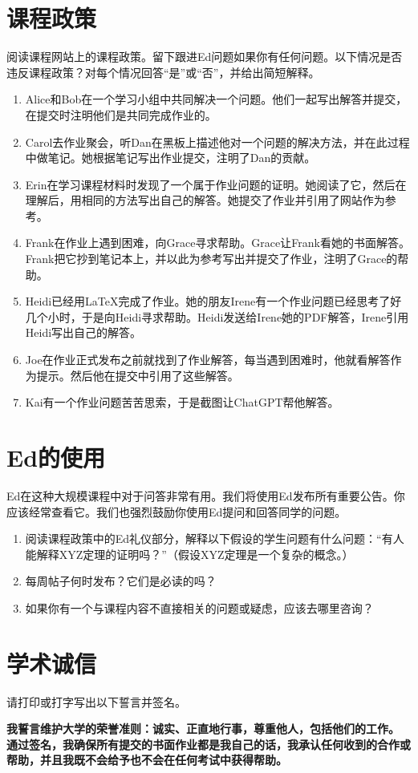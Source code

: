 \documentclass[11pt]{article}
\begin{document}
\section*{课程政策}
阅读课程网站上的课程政策。留下跟进Ed问题如果你有任何问题。以下情况是否违反课程政策？对每个情况回答“是”或“否”，并给出简短解释。
\begin{enumerate}
  \item Alice和Bob在一个学习小组中共同解决一个问题。他们一起写出解答并提交，在提交时注明他们是共同完成作业的。
  \item Carol去作业聚会，听Dan在黑板上描述他对一个问题的解决方法，并在此过程中做笔记。她根据笔记写出作业提交，注明了Dan的贡献。
  \item Erin在学习课程材料时发现了一个属于作业问题的证明。她阅读了它，然后在理解后，用相同的方法写出自己的解答。她提交了作业并引用了网站作为参考。
  \item Frank在作业上遇到困难，向Grace寻求帮助。Grace让Frank看她的书面解答。Frank把它抄到笔记本上，并以此为参考写出并提交了作业，注明了Grace的帮助。
  \item Heidi已经用LaTeX完成了作业。她的朋友Irene有一个作业问题已经思考了好几个小时，于是向Heidi寻求帮助。Heidi发送给Irene她的PDF解答，Irene引用Heidi写出自己的解答。
  \item Joe在作业正式发布之前就找到了作业解答，每当遇到困难时，他就看解答作为提示。然后他在提交中引用了这些解答。
  \item Kai有一个作业问题苦苦思索，于是截图让ChatGPT帮他解答。
\end{enumerate}

\section*{Ed的使用}
Ed在这种大规模课程中对于问答非常有用。我们将使用Ed发布所有重要公告。你应该经常查看它。我们也强烈鼓励你使用Ed提问和回答同学的问题。
\begin{enumerate}
  \item 阅读课程政策中的Ed礼仪部分，解释以下假设的学生问题有什么问题：“有人能解释XYZ定理的证明吗？”（假设XYZ定理是一个复杂的概念。）
  \item 每周帖子何时发布？它们是必读的吗？
  \item 如果你有一个与课程内容不直接相关的问题或疑虑，应该去哪里咨询？
\end{enumerate}

\section*{学术诚信}
请打印或打字写出以下誓言并签名。
\begin{center}
\textbf{我誓言维护大学的荣誉准则：诚实、正直地行事，尊重他人，包括他们的工作。} \textbf{通过签名，我确保所有提交的书面作业都是我自己的话，我承认任何收到的合作或帮助，并且我既不会给予也不会在任何考试中获得帮助。}
\end{center}
\end{document}

